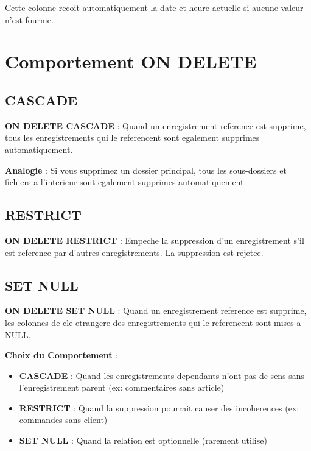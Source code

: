 \documentclass[a4paper,12pt]{book}
\begin{document}
Cette colonne recoit automatiquement la date et heure actuelle si aucune valeur n'est fournie.

\section{Comportement ON DELETE}

\subsection{CASCADE}

\begin{definitionbox}
    \textbf{ON DELETE CASCADE} : Quand un enregistrement reference est supprime, tous les enregistrements qui le referencent sont egalement supprimes automatiquement.
\end{definitionbox}

\begin{analogybox}
    \textbf{Analogie} : Si vous supprimez un dossier principal, tous les sous-dossiers et fichiers a l'interieur sont egalement supprimes automatiquement.
\end{analogybox}

\subsection{RESTRICT}

\begin{definitionbox}
    \textbf{ON DELETE RESTRICT} : Empeche la suppression d'un enregistrement s'il est reference par d'autres enregistrements. La suppression est rejetee.
\end{definitionbox}

\subsection{SET NULL}

\begin{definitionbox}
    \textbf{ON DELETE SET NULL} : Quand un enregistrement reference est supprime, les colonnes de cle etrangere des enregistrements qui le referencent sont mises a NULL.
\end{definitionbox}

\begin{bestpracticebox}
    \textbf{Choix du Comportement} :
    \begin{itemize}
        \item \textbf{CASCADE} : Quand les enregistrements dependants n'ont pas de sens sans l'enregistrement parent (ex: commentaires sans article)
        \item \textbf{RESTRICT} : Quand la suppression pourrait causer des incoherences (ex: commandes sans client)
        \item \textbf{SET NULL} : Quand la relation est optionnelle (rarement utilise)
    \end{itemize}
\end{bestpracticebox}
\end{document}
